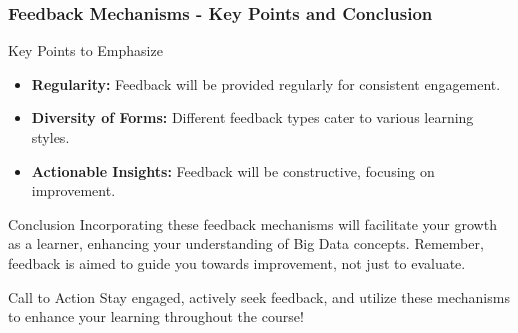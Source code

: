 \documentclass[aspectratio=169]{beamer}
\begin{document}
\begin{frame}[fragile]
    \frametitle{Feedback Mechanisms - Key Points and Conclusion}
    \begin{block}{Key Points to Emphasize}
        \begin{itemize}
            \item \textbf{Regularity:} Feedback will be provided regularly for consistent engagement.
            \item \textbf{Diversity of Forms:} Different feedback types cater to various learning styles.
            \item \textbf{Actionable Insights:} Feedback will be constructive, focusing on improvement.
        \end{itemize}
    \end{block}
    
    \begin{block}{Conclusion}
        Incorporating these feedback mechanisms will facilitate your growth as a learner, enhancing your understanding of Big Data concepts. Remember, feedback is aimed to guide you towards improvement, not just to evaluate.
    \end{block}
    
    \begin{block}{Call to Action}
        Stay engaged, actively seek feedback, and utilize these mechanisms to enhance your learning throughout the course!
    \end{block}
\end{frame}
\end{document}
